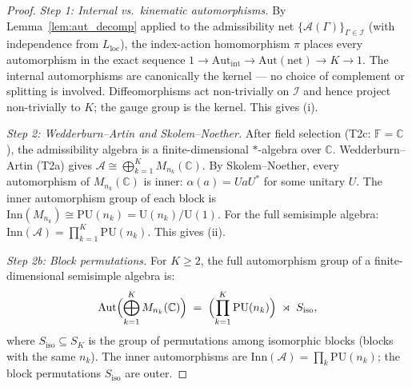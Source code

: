 \documentclass[11pt]{article}
\theoremstyle{definition}
\begin{document}
\begin{proof}

\textit{Step 1: Internal vs.\ kinematic automorphisms.}\quad
By Lemma~\ref{lem:aut_decomp} applied to the admissibility net
$\{\mathcal{A}(\Gamma)\}_{\Gamma \in \mathcal{I}}$ (with independence
from $L_{\mathrm{loc}}$), the index-action homomorphism $\pi$ places
every automorphism in the exact sequence
$1 \to \mathrm{Aut}_{\mathrm{int}} \to \mathrm{Aut}(\text{net})
\to K \to 1$.  The internal automorphisms are canonically the kernel
--- no choice of complement or splitting is involved.  Diffeomorphisms
act non-trivially on $\mathcal{I}$ and hence project non-trivially to
$K$; the gauge group is the kernel.  This gives (i).

\textit{Step 2: Wedderburn--Artin and Skolem--Noether.}\quad
After field selection (T2c: $\mathbb{F} = \mathbb{C}$), the admissibility
algebra is a finite-dimensional $*$-algebra over $\mathbb{C}$.
Wedderburn--Artin (T2a) gives
$\mathcal{A} \cong \bigoplus_{k=1}^{K} M_{n_k}(\mathbb{C})$.
By Skolem--Noether, every automorphism of $M_{n_k}(\mathbb{C})$ is inner:
$\alpha(a) = UaU^*$ for some unitary $U$.  The inner automorphism group
of each block is $\mathrm{Inn}(M_{n_k}) \cong \mathrm{PU}(n_k) =
\mathrm{U}(n_k) / \mathrm{U}(1)$.  For the full semisimple algebra:
$\mathrm{Inn}(\mathcal{A}) = \prod_{k=1}^K \mathrm{PU}(n_k)$.
This gives (ii).

\textit{Step 2b: Block permutations.}\quad
For $K \ge 2$, the full automorphism group of a finite-dimensional
semisimple algebra is:
\[
  \mathrm{Aut}\Bigl(\bigoplus_{k=1}^K M_{n_k}(\mathbb{C})\Bigr)
  \;=\;
  \Bigl(\prod_{k=1}^K \mathrm{PU}(n_k)\Bigr) \;\rtimes\; S_{\mathrm{iso}},
\]
where $S_{\mathrm{iso}} \subseteq S_K$ is the group of permutations among
isomorphic blocks (blocks with the same $n_k$).  The inner automorphisms
are $\mathrm{Inn}(\mathcal{A}) = \prod_k \mathrm{PU}(n_k)$; the block
permutations $S_{\mathrm{iso}}$ are outer.


\end{proof}
\end{document}
